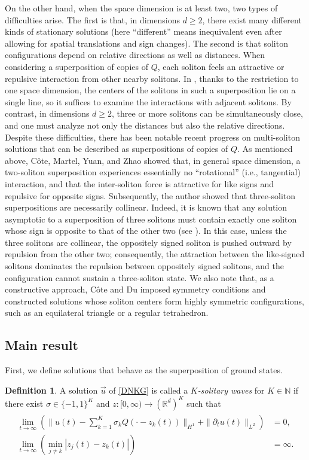 \documentclass[reqno]{amsart}
\theoremstyle{plain}
\theoremstyle{definition}
\newtheorem{definition}{Definition}[section]
\numberwithin{equation}{section}
\newcommand{\1}{\mathbbm{1}}
\begin{document}
On the other hand, when the space dimension is at least two, two types of difficulties arise. The first is that, in dimensions $d\geq 2$, there exist many different kinds of stationary solutions (here “different” means inequivalent even after allowing for spatial translations and sign changes). The second is that soliton configurations depend on relative directions as well as distances. When considering a superposition of copies of $Q$,  each soliton feels an attractive or repulsive interaction from other nearby solitons. In \cite{CMY}, thanks to the restriction to one space dimension, the centers of the solitons in such a superposition lie on a single line, so it suffices to examine the interactions with adjacent solitons. By contrast, in dimensions $d\geq 2$, three or more solitons can be simultaneously close, and one must analyze not only the distances but also the relative directions. Despite these difficulties, there has been notable recent progress on multi-soliton solutions that can be described as superpositions of copies of  $Q$. As mentioned above, C\^{o}te, Martel, Yuan, and Zhao \cite{CMYZ} showed that, in general space dimension, a two-soliton superposition experiences essentially no “rotational” (i.e., tangential) interaction, and that the inter-soliton force is attractive for like signs and repulsive for opposite signs. Subsequently, the author \cite{I2} showed that three-soliton superpositions are necessarily collinear.  Indeed, it is known that any solution asymptotic to a superposition of three solitons must contain exactly one soliton whose sign is opposite to that of the other two (see \cite{CD}). In this case, unless the three solitons are collinear, the oppositely signed soliton is pushed outward by repulsion from the other two; consequently, the attraction between the like-signed solitons dominates the repulsion between oppositely signed solitons, and the configuration cannot sustain a three-soliton state. We also note that, as a constructive approach, C\^{o}te and Du \cite{CD} imposed symmetry conditions and constructed solutions whose soliton centers form highly symmetric configurations, such as an equilateral triangle or a regular tetrahedron.


\subsection{Main result}
First, we define solutions that behave as the superposition of ground states.
\begin{definition}\label{defKsoli}
A solution $\vec{u}$ of \eqref{DNKG} is called a \textit{$K$-solitary waves} for $K\in\mathbb{N}$ if there exist $\sigma \in \{-1,1\}^K$ and $z:[0,\infty)\to (\mathbb{R}^d)^K$ such that 
\begin{align}
\label{Ksoli}
\begin{aligned}
\lim_{t\to \infty} \left(\|u(t)-\sum_{k=1}^K\sigma_k Q(\cdot-z_k(t))\|_{H^1}+\|{\partial}_tu(t)\|_{L^2}\right)&=0,
\\
\lim_{t\to\infty}\left( \min_{j\neq k}|z_j(t)-z_k(t)|\right)&=\infty.
\end{aligned}
\end{align}
\end{definition}
\end{document}

